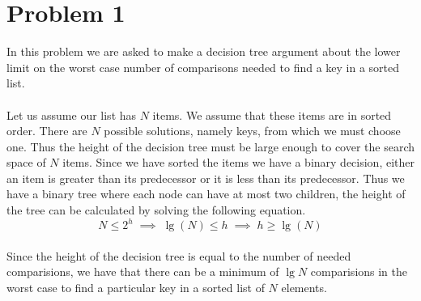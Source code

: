 \section*{Problem 1}

In this problem we are asked to make a decision tree argument about the
lower limit on the worst case number of comparisons needed to find a
key in a sorted list.
\\
\\
Let us assume our list has $N$ items. We assume that these items are in
sorted order. There are $N$ possible solutions, namely keys, from which 
we must choose one. Thus the height of the decision tree must be large
enough to cover the search space of $N$ items. Since we have sorted the 
items we have a binary decision, either an item is greater than its 
predecessor or it is less than its predecessor. Thus we have a binary 
tree where each node can have at most two children, the height of the 
tree can be calculated by solving the following equation.
\\
$$
    N \leq 2^h \; \implies \; 
    \lg (N) \leq h \; \implies \; 
    h \geq \lg (N)
$$
\\
Since the height of the decision tree is equal to the number of needed
comparisions, we have that there can be a minimum of $\lg N$
comparisions in the worst case to find a particular key in a sorted
list of $N$ elements.
